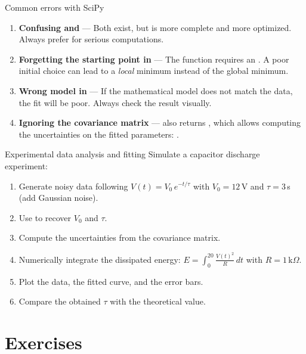 \begin{errmark}{Common errors with SciPy}
\begin{enumerate}
  \item \textbf{Confusing  and } ---
    Both exist, but  is more complete and more optimized.
    Always prefer  for serious computations.
  \item \textbf{Forgetting the starting point in } ---
    The function  requires an . A poor initial choice can
    lead to a \emph{local} minimum instead of the global minimum.
  \item \textbf{Wrong model in } --- If the mathematical model
    does not match the data, the fit will be poor. Always check
    the result visually.
  \item \textbf{Ignoring the covariance matrix} ---  also returns
    , which allows computing the uncertainties on the fitted
    parameters: .
\end{enumerate}
\end{errmark}

\begin{projet}{Experimental data analysis and fitting}
Simulate a capacitor discharge experiment:
\begin{enumerate}
  \item Generate noisy data following $V(t) = V_0 \, e^{-t/\tau}$
    with $V_0 = 12$\,V and $\tau = 3$\,s (add Gaussian noise).
  \item Use  to recover $V_0$ and $\tau$.
  \item Compute the uncertainties from the covariance matrix.
  \item Numerically integrate the dissipated energy:
    $E = \int_0^{20} \frac{V(t)^2}{R}\,dt$ with $R = 1\,\text{k}\Omega$.
  \item Plot the data, the fitted curve, and the error bars.
  \item Compare the obtained $\tau$ with the theoretical value.
\end{enumerate}
\end{projet}

\section{Exercises}

